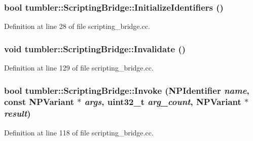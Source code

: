 \hypertarget{classtumbler_1_1_scripting_bridge_a9653f59bae05d24f2f319a2764a7ce61}{
\subsubsection[{InitializeIdentifiers}]{\setlength{\rightskip}{0pt plus 5cm}bool tumbler::ScriptingBridge::InitializeIdentifiers ()}}
\label{classtumbler_1_1_scripting_bridge_a9653f59bae05d24f2f319a2764a7ce61}


Definition at line 28 of file scripting\_\-bridge.cc.

\hypertarget{classtumbler_1_1_scripting_bridge_a79ca9287d682b30670932c235ce025b4}{
\subsubsection[{Invalidate}]{\setlength{\rightskip}{0pt plus 5cm}void tumbler::ScriptingBridge::Invalidate ()}}
\label{classtumbler_1_1_scripting_bridge_a79ca9287d682b30670932c235ce025b4}


Definition at line 129 of file scripting\_\-bridge.cc.

\hypertarget{classtumbler_1_1_scripting_bridge_a70638ad7da4726fb8ccbc6f49868fafc}{
\subsubsection[{Invoke}]{\setlength{\rightskip}{0pt plus 5cm}bool tumbler::ScriptingBridge::Invoke (NPIdentifier {\em name}, \/  const NPVariant $\ast$ {\em args}, \/  uint32\_\-t {\em arg\_\-count}, \/  NPVariant $\ast$ {\em result})}}
\label{classtumbler_1_1_scripting_bridge_a70638ad7da4726fb8ccbc6f49868fafc}


Definition at line 118 of file scripting\_\-bridge.cc.

